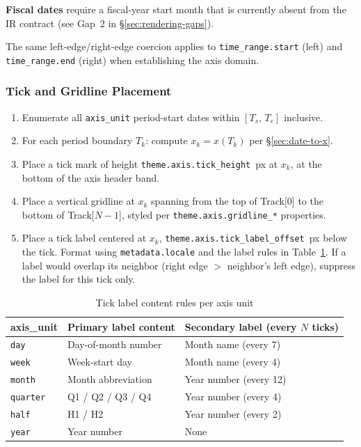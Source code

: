 \textbf{Fiscal dates} require a fiscal-year start month that is currently absent from the IR
contract (see Gap~2 in \S\ref{sec:rendering-gaps}).

The same left-edge/right-edge coercion applies to \texttt{time\_range.start} (left) and
\texttt{time\_range.end} (right) when establishing the axis domain.

\subsubsection{Tick and Gridline Placement}
\label{sec:tick-placement}

\begin{enumerate}
  \item Enumerate all \texttt{axis\_unit} period-start dates within $[T_s,\,T_e]$ inclusive.
  \item For each period boundary $T_k$: compute $x_k = x(T_k)$ per \S\ref{sec:date-to-x}.
  \item Place a tick mark of height \texttt{theme.axis.tick\_height}~px at $x_k$, at the
        bottom of the axis header band.
  \item Place a vertical gridline at $x_k$ spanning from the top of Track[0] to the bottom
        of Track[$N-1$], styled per \texttt{theme.axis.gridline\_*} properties.
  \item Place a tick label centered at $x_k$, \texttt{theme.axis.tick\_label\_offset}~px
        below the tick. Format using \texttt{metadata.locale} and the label rules in
        Table~\ref{tab:tick-label-density}. If a label would overlap its neighbor (right
        edge $>$ neighbor's left edge), suppress the label for this tick only.
\end{enumerate}

\begin{table}[h]
\centering
\small
\begin{tabular}{lll}
\toprule
\textbf{axis\_unit} & \textbf{Primary label content} & \textbf{Secondary label (every $N$ ticks)} \\
\midrule
\texttt{day}     & Day-of-month number         & Month name (every 7) \\
\texttt{week}    & Week-start day              & Month name (every 4) \\
\texttt{month}   & Month abbreviation          & Year number (every 12) \\
\texttt{quarter} & Q1 / Q2 / Q3 / Q4           & Year number (every 4) \\
\texttt{half}    & H1 / H2                     & Year number (every 2) \\
\texttt{year}    & Year number                 & None \\
\bottomrule
\end{tabular}
\caption{Tick label content rules per axis unit}
\label{tab:tick-label-density}
\end{table}

